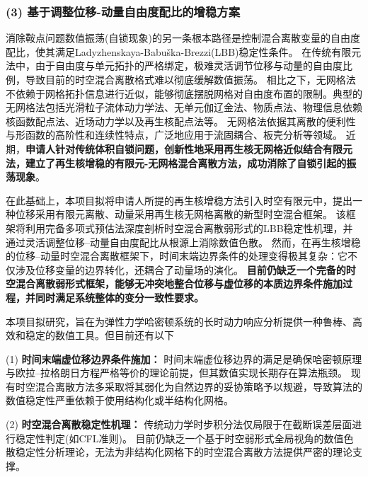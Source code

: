 \subsubsection*{\bfseries (3) 基于调整位移-动量自由度配比的增稳方案}

消除鞍点问题数值振荡(自锁现象)的另一条根本路径是控制混合离散变量的自由度配比，使其满足Ladyzhenskaya-Babuška-Brezzi(LBB)稳定性条件。
在传统有限元法中，由于自由度与单元拓扑的严格绑定，极难灵活调节位移与动量的自由度比例，导致目前的时空混合离散格式难以彻底缓解数值振荡。
相比之下，无网格法不依赖于网格拓扑信息进行近似，能够彻底摆脱网格对自由度布置的限制。典型的无网格法包括光滑粒子流体动力学法、无单元伽辽金法、物质点法、物理信息依赖核函数配点法、近场动力学以及再生核配点法等。
无网格法依据其离散的便利性与形函数的高阶性和连续性特点，广泛地应用于流固耦合、板壳分析等领域。
近期，\textbf{申请人针对传统体积自锁问题，创新性地采用再生核无网格近似结合有限元法，建立了再生核增稳的有限元-无网格混合离散方法，成功消除了自锁引起的振荡现象}。

在此基础上，本项目拟将申请人所提的再生核增稳方法引入时空有限元中，提出一种位移采用有限元离散、动量采用再生核无网格离散的新型时空混合框架。
该框架将利用完备多项式预估法深度剖析时空混合离散弱形式的LBB稳定性机理，并通过灵活调整位移--动量自由度配比从根源上消除数值色散。
然而，在再生核增稳的位移--动量时空混合离散框架下，时间末端边界条件的处理变得极其复杂：它不仅涉及位移变量的边界转化，还耦合了动量场的演化。
\textbf{目前仍缺乏一个完备的时空混合离散弱形式框架，能够无冲突地整合位移与虚位移的本质边界条件施加过程，并同时满足系统整体的变分一致性要求。}

本项目拟研究\titlecn，旨在为弹性力学哈密顿系统的长时动力响应分析提供一种鲁棒、高效和稳定的数值工具。但目前还有以下

(1) \textbf{时间末端虚位移边界条件施加：}
时间末端虚位移边界的满足是确保哈密顿原理与欧拉--拉格朗日方程严格等价的理论前提，但其数值实现长期存在算法瓶颈。
现有时空混合离散方法多采取将其弱化为自然边界的妥协策略予以规避，导致算法的数值稳定性严重依赖于使用结构化或半结构化网格。

(2) \textbf{时空混合离散稳定性机理：}
传统动力学时步积分法仅局限于在截断误差层面进行稳定性判定(如CFL准则)。
目前仍缺乏一个基于时空弱形式全局视角的数值色散稳定性分析理论，无法为非结构化网格下的时空混合离散方法提供严密的理论支撑。

